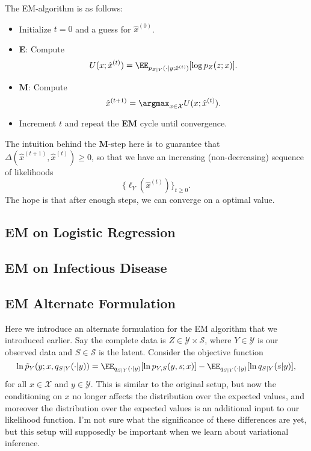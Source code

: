 The EM-algorithm is as follows: 
\begin{itemize}
	\item Initialize $t=0$ and a guess for $\hat{x}^{(0)}$. 
	\item \textbf{E}: Compute 
		\[U(x;\hat{x}^{(t)}) = \EE_{p_{Z|Y}(\cdot | y; \hat{x}^{(t)})}[\log p_Z(z;x)].\] 
	\item \textbf{M}: Compute 
		\[\hat{x}^{(t+1)} = \argmax_{x\in \mathcal{X}}U(x; \hat{x}^{(t)}).\]
	\item Increment $t$ and repeat the \textbf{EM} cycle until convergence. 
\end{itemize}
The intuition behind the \textbf{M}-step here is to guarantee that $\Delta(\hat{x}^{(t+1)}, \hat{x}^{(t)}) \geq 0$, so that we have an increasing (non-decreasing) sequence of likelihoods 
\[\{\ell_Y(\hat{x}^{(t)})\}_{t\geq 0}.\] 
The hope is that after enough steps, we can converge on a optimal value. 

\subsection{EM on Logistic Regression}

\subsection{EM on Infectious Disease}

\subsection{EM Alternate Formulation}

Here we introduce an alternate formulation for the EM algorithm that we introduced earlier. Say the complete data is $Z\in \mathcal{Y}\times \mathcal{S}$, where $Y\in \mathcal{Y}$ is our observed data and $S\in \mathcal{S}$ is the latent. Consider the objective function 
\[\ln \tilde{p}_{Y}(y;x,q_{S|Y}(\cdot|y)) = \EE_{q_{S|Y}(\cdot | y)}[\ln p_{Y,S}(y,s;x)] - \EE_{q_{S|Y}(\cdot | y)}[\ln q_{S|Y}(s|y)],\] 
for all $x\in \mathcal{X}$ and $y\in \mathcal{Y}$. This is similar to the original setup, but now the conditioning on $x$ no longer affects the distribution over the expected values, and moreover the distribution over the expected values is an additional input to our likelihood function. I'm not sure what the significance of these differences are yet, but this setup will supposedly be important when we learn about variational inference. 

